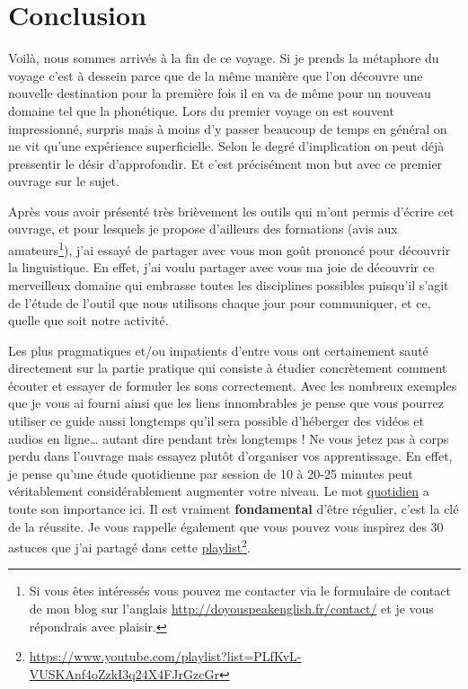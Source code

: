 \part{Conclusion}\label{chap:conc}

Voilà, nous sommes arrivés à la fin de ce voyage. Si je prends la
métaphore du voyage c'est à dessein parce que de la même manière que
l'on découvre une nouvelle destination pour la première fois il en va
de même pour un nouveau domaine tel que la phonétique. Lors du premier
voyage on est souvent impressionné, surpris mais à moins d'y passer
beaucoup de temps en général on ne vit qu'une expérience
superficielle. Selon le degré d'implication on peut déjà pressentir le
désir d'approfondir. Et c'est précisément mon but avec ce premier
ouvrage sur le sujet.

Après vous avoir présenté très brièvement les outils qui m'ont permis
d'écrire cet ouvrage, et pour lesquels je propose d'ailleurs des
formations (avis aux amateurs\footnote{Si vous êtes intéressés vous
  pouvez me contacter via le formulaire de contact de mon blog sur
  l'anglais \url{http://doyouspeakenglish.fr/contact/} et je vous
  répondrais avec plaisir.}), j'ai essayé de partager avec vous mon
goût prononcé pour découvrir la linguistique. En effet, j'ai voulu
partager avec vous ma joie de découvrir ce merveilleux domaine qui
embrasse toutes les disciplines possibles puisqu'il s'agit de l'étude
de l'outil que nous utilisons chaque jour pour communiquer, et ce,
quelle que soit notre activité.

Les plus pragmatiques et/ou impatients d'entre vous ont certainement
sauté directement sur la partie pratique qui consiste à étudier
concrètement comment écouter et essayer de formuler les sons
correctement. Avec les nombreux exemples que je vous ai fourni ainsi
que les liens innombrables je pense que vous pourrez utiliser ce guide
aussi longtemps qu'il sera possible d'héberger des vidéos et audios en
ligne\dots{} autant dire pendant très longtemps ! Ne vous jetez pas à
corps perdu dans l'ouvrage mais essayez plutôt d'organiser vos
apprentissage. En effet, je pense qu'une étude quotidienne par session
de 10 à 20-25 minutes peut véritablement considérablement augmenter
votre niveau. Le mot \underline{quotidien} a toute son importance
ici. Il est vraiment \textbf{fondamental} d'être régulier, c'est la
clé de la réussite. Je vous rappelle également que vous pouvez vous
inspirez des 30 astuces que j'ai partagé dans cette
\href{https://www.youtube.com/playlist?list=PLfKvL-VUSKAnf4oZzkI3q24X4FJrGzcGr}{playlist}\footnote{\url{https://www.youtube.com/playlist?list=PLfKvL-VUSKAnf4oZzkI3q24X4FJrGzcGr}}.

